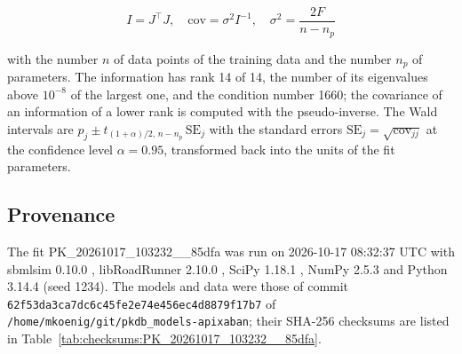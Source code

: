 \begin{equation}
I = J^\top J, \quad \mathrm{cov} = \sigma^2 I^{-1}, \quad \sigma^2 = \frac{2 F}{n - n_p}
\end{equation}

with the number $n$ of data points of the training data and the number $n_p$ of parameters. The information has rank 14 of 14, the number of its eigenvalues above $10^{-8}$ of the largest one, and the condition number 1660; the covariance of an information of a lower rank is computed with the pseudo-inverse. The Wald intervals are $\hat{p}_j \pm t_{(1+\alpha)/2,\, n-n_p}\, \mathrm{SE}_j$ with the standard errors $\mathrm{SE}_j = \sqrt{\mathrm{cov}_{jj}}$ at the confidence level $\alpha = 0.95$, transformed back into the units of the fit parameters.

\subsection{Provenance}

The fit PK\_20261017\_103232\_\_85dfa was run on 2026-10-17 08:32:37 UTC with sbmlsim 0.10.0 \cite{Koenig2026_sbmlsim}, libRoadRunner 2.10.0 \cite{Welsh2023}, SciPy 1.18.1 \cite{Virtanen2020}, NumPy 2.5.3 \cite{Harris2020} and Python 3.14.4 (seed 1234). The models and data were those of commit \texttt{62f53da3ca7dc6c45fe2e74e456ec4d8879f17b7} of \texttt{/home/mkoenig/git/pkdb\_models-apixaban}; their SHA-256 checksums are listed in Table~\ref{tab:checksums:PK_20261017_103232__85dfa}.

